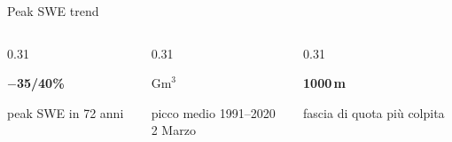 \begin{frame}{Peak SWE trend}
  \vspace{0.75cm} 
  \begin{columns}[T, onlytextwidth]
    \begin{column}{0.31\textwidth}
      \centering
      {\large\bfseries\boldmath $-$35/40\%\par}
      {\footnotesize peak SWE in 72 anni\par}
    \end{column}
    \begin{column}{0.31\textwidth}
      \centering
      {\large\bfseries{} $\text{Gm}^3$\par}
      {\footnotesize picco medio 1991--2020\\2 Marzo\par}
    \end{column}
    \begin{column}{0.31\textwidth}
      \centering
      {\large\bfseries \smallleq{} 1000\,m\par}
      {\footnotesize fascia di quota più colpita\par}
    \end{column}
  \end{columns}
\end{frame}


